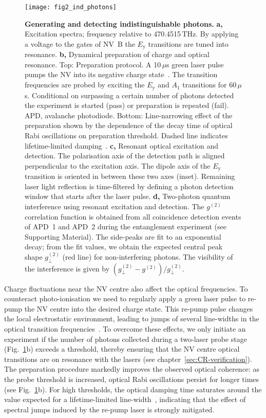 \begin{figure}[tp]
	\centering
	\texttt{[image: fig2\_ind\_photons]}
	\caption{\label{fig:LDE-fig2} \textbf{Generating and detecting indistinguishable photons.}
	\textbf{a,} Excitation spectra; frequency relative to 470.4515$\,$THz. By applying a voltage to the gates of NV~B the $E_\text{y}$ transitions are tuned into resonance. 
	\textbf{b,} Dynamical preparation of charge and optical resonance. Top: Preparation protocol. A 10$\,\mu$s green laser pulse pumps the NV into its negative charge state~\cite{Robledo2011}. The transition frequencies are probed by exciting the $E_\text{y}$ and $A_\text{1}$ transitions for 60$\,\mu$s. Conditional on surpassing a certain number of photons detected the experiment is started (pass) or preparation is repeated (fail). APD, avalanche photodiode. Bottom: Line-narrowing effect of the preparation shown by the dependence of the decay time of optical Rabi oscillations on preparation threshold. Dashed line indicates lifetime-limited damping~\cite{Robledo2010}. 
	\textbf{c,} Resonant optical excitation and detection. The polarisation axis of the detection path is aligned perpendicular to the excitation axis. The dipole axis of the $E_\text{y}$ transition is oriented in between these two axes (inset). Remaining laser light reflection is time-filtered by defining a photon detection window that starts after the laser pulse. 
	\textbf{d,} Two-photon quantum interference using resonant excitation and detection. The $g^{(2)}$ correlation function is obtained from all coincidence detection events of APD~1 and APD~2 during the entanglement experiment (see Supporting Material). The side-peaks are fit to an exponential decay; from the fit values, we obtain the expected central peak shape $g_\perp^{(2)}$ (red line) for non-interfering photons. The visibility of the interference is given by $(g_\perp^{(2)}-g^{(2)})/g_\perp^{(2)}$.}
\end{figure}

Charge fluctuations near the NV centre also affect the optical frequencies. To counteract photo-ionisation we need to regularly apply a green laser pulse to re-pump the NV centre into the desired charge state. This re-pump pulse changes the local electrostatic environment, leading to jumps of several line-widths in the optical transition frequencies~\cite{Robledo2010}. To overcome these effects, we only initiate an experiment if the number of photons collected during a two-laser probe stage (Fig.~\ref{fig:LDE-fig2}b) exceeds a threshold, thereby ensuring that the NV centre optical transitions are on resonance with the lasers (see chapter~\ref{sec:CR-verification}). The preparation procedure markedly improves the observed optical coherence: as the probe threshold is increased, optical Rabi oscillations persist for longer times (see Fig.~\ref{fig:LDE-fig2}b). For high thresholds, the optical damping time saturates around the value expected for a lifetime-limited line-width~\cite{Robledo2010}, indicating that the effect of spectral jumps induced by the re-pump laser is strongly mitigated.

